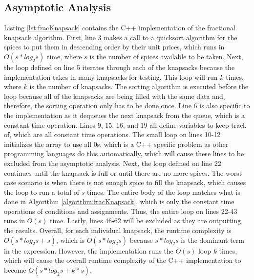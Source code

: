 \documentclass[letterpaper, 10pt,DIV=13]{scrartcl}
\numberwithin{equation}{section} %
\numberwithin{figure}{section} %
\numberwithin{table}{section} %
\begin{document}
\subsection{Asymptotic Analysis}
Listing \ref{lst:fracKnapsack} contains the C++ implementation of the fractional knapsack algorithm. First, line 3 makes a call to a quicksort algorithm for the spices to put them in descending order by their unit prices, which runs in $O(s * log_2s)$ time, where $s$ is the number of spices available to be taken. Next, the loop defined on line 5 iterates through each of the knapsacks because the implementation takes in many knapsacks for testing. This loop will run $k$ times, where $k$ is the number of knapsacks. The sorting algorithm is executed before the loop because all of the knapsacks are being filled with the same data and, therefore, the sorting operation only has to be done once. Line 6 is also specific to the implementation as it dequeues the next knapsack from the queue, which is a constant time operation. Lines 9, 15, 16, and 19 all define variables to keep track of, which are all constant time operations. The small loop on lines 10-12 initializes the array to use all 0s, which is a C++ specific problem as other programming languages do this automatically, which will cause these lines to be excluded from the asymptotic analysis. Next, the loop defined on line 22 continues until the knapsack is full or until there are no more spices. The worst case scenario is when there is not enough spice to fill the knapsack, which causes the loop to run a total of $s$ times. The entire body of the loop matches what is done in Algorithm \ref{algorithm:fracKnapsack}, which is only the constant time operations of conditions and assignments. Thus, the entire loop on lines 22-43 runs in $O(s)$ time. Lastly, lines 46-62 will be excluded as they are outputting the results. Overall, for each individual knapsack, the runtime complexity is $O(s * log_2s + s)$, which is $O(s * log_2s)$ because $s * log_2s$ is the dominant term in the expression. However, the implementation runs the $O(s)$ loop $k$ times, which will cause the overall runtime complexity of the C++ implementation to become $O(s * log_2s + k * s)$.

\lstset{numbers=left, numberstyle=\tiny, stepnumber=1, numbersep=5pt}

\end{document}
